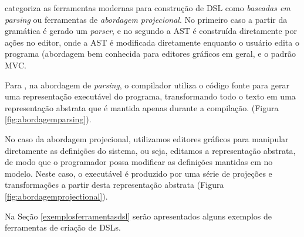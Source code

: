  categoriza as ferramentas modernas para construção de \gls{DSL} como \textit{baseadas em parsing} ou ferramentas de \textit{abordagem projecional}. No primeiro caso a partir da gramática é gerado um \textit{parser}, e no segundo a \gls{AST} é construída diretamente por ações no editor, onde a \gls{AST} é modificada diretamente enquanto o usuário edita o programa (abordagem bem conhecida para editores gráficos em geral, e o padrão \gls{MVC}. 

Para , na abordagem de \textit{parsing}, o compilador utiliza o código fonte para gerar uma representação executável do programa, transformando todo o texto em uma representação abstrata que é mantida apenas durante a compilação. (Figura \ref{fig:abordagemparsing}). 



\newpage
No caso da abordagem projecional, utilizamos editores gráficos para manipular diretamente as definições do sistema, ou seja, editamos a representação abstrata, de modo que o programador possa modificar as definições mantidas em no modelo. Neste caso, o executável é produzido por uma série de projeções e transformações a partir desta representação abstrata (Figura \ref{fig:abordagemprojectional}).




Na Seção \ref{exemplosferramentasdsl} serão apresentados alguns exemplos de ferramentas de criação de \gls{DSL}s.


